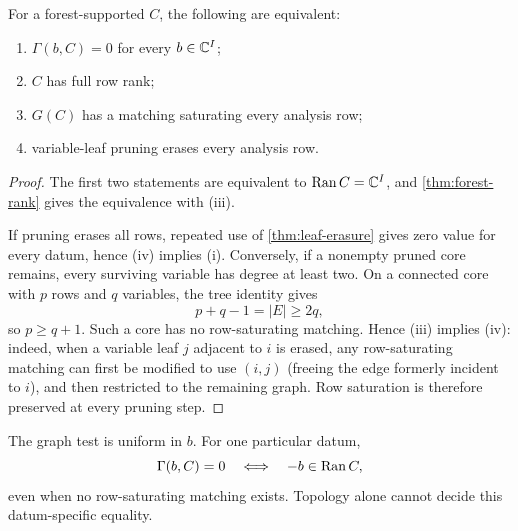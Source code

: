 \begin{corollary}\label{cor:zero-test}
For a forest-supported \(C\), the following are equivalent:
\begin{enumerate}[label=(\roman*),leftmargin=2.5em]
\item \(\Gamma(b,C)=0\) for every \(b\in\mathbb C^I\);
\item \(C\) has full row rank;
\item \(G(C)\) has a matching saturating every analysis row;
\item variable-leaf pruning erases every analysis row.
\end{enumerate}
\end{corollary}

\begin{proof}
The first two statements are equivalent to \(\operatorname{Ran} C=\mathbb C^I\), and
\cref{thm:forest-rank} gives the equivalence with (iii).

If pruning erases all rows, repeated use of
\cref{thm:leaf-erasure} gives zero value for every datum, hence (iv)
implies (i).  Conversely, if a nonempty pruned core remains, every
surviving variable has degree at least two.  On a connected core with
\(p\) rows and \(q\) variables, the tree identity gives
\[
 p+q-1=|E|\ge2q,
\]
so \(p\ge q+1\).  Such a core has no row-saturating matching.  Hence
(iii) implies (iv): indeed, when a variable leaf \(j\) adjacent to
\(i\) is erased, any row-saturating matching can first be modified to
use \((i,j)\) (freeing the edge formerly incident to \(i\)), and then
restricted to the remaining graph.  Row saturation is therefore
preserved at every pruning step.
\end{proof}

\begin{remark}\label{rem:specific-zero}
The graph test is uniform in \(b\).  For one particular datum,
\[
 \Gamma(b,C)=0
 \quad\Longleftrightarrow\quad
 -b\in\operatorname{Ran} C,
\]
even when no row-saturating matching exists.  Topology alone cannot
decide this datum-specific equality.
\end{remark}
